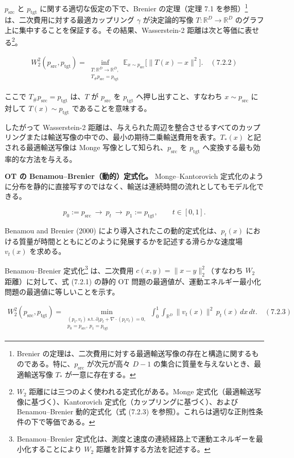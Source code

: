 $p_{\mathrm{src}}$ と $p_{\mathrm{tgt}}$ に関する適切な仮定の下で、Brenier の定理（定理 7.1 を参照）\footnote{Brenier の定理は、二次費用に対する最適輸送写像の存在と構造に関するものである。特に、$p_{\mathrm{src}}$ が次元が高々 $D-1$ の集合に質量を与えないとき、最適輸送写像 $T_*$ が一意に存在する。} は、二次費用に対する最適カップリング $\gamma$ が決定論的写像 $T:\mathbb{R}^D\to\mathbb{R}^D$ のグラフ上に集中することを保証する。その結果、Wasserstein-2 距離は次と等価に表せる\footnote{$W_2$ 距離には三つのよく使われる定式化がある。Monge 定式化（最適輸送写像に基づく）、Kantorovich 定式化（カップリングに基づく）、および Benamou–Brenier 動的定式化（式 (7.2.3) を参照）。これらは適切な正則性条件の下で等価である。}。

\begin{align*}
W_2^2(p_{\mathrm{src}},p_{\mathrm{tgt}})
=
\inf_{\substack{T:\mathbb{R}^D\to\mathbb{R}^D,\\ T_{\#}p_{\mathrm{src}}=p_{\mathrm{tgt}}}}
\mathbb{E}_{x\sim p_{\mathrm{src}}}\bigl[\|T(x)-x\|^2\bigr].
\quad (7.2.2)
\end{align*}


ここで $T_{\#}p_{\mathrm{src}}=p_{\mathrm{tgt}}$ は、$T$ が $p_{\mathrm{src}}$ を $p_{\mathrm{tgt}}$ へ押し出すこと、すなわち $x\sim p_{\mathrm{src}}$ に対して $T(x)\sim p_{\mathrm{tgt}}$ であることを意味する。

したがって Wasserstein-2 距離は、与えられた周辺を整合させるすべてのカップリングまたは輸送写像の中での、最小の期待二乗輸送費用を表す。$T_*(x)$ と記される最適輸送写像は Monge 写像として知られ、$p_{\mathrm{src}}$ を $p_{\mathrm{tgt}}$ へ変換する最も効率的な方法を与える。

\textbf{OT の Benamou–Brenier（動的）定式化。} Monge–Kantorovich 定式化のように分布を静的に直接写すのではなく、輸送は連続時間の流れとしてもモデル化できる。

\[
p_0:=p_{\mathrm{src}}\ \to\ p_t\ \to\ p_1:=p_{\mathrm{tgt}},\qquad t\in[0,1].
\]


Benamou and Brenier (2000) により導入されたこの動的定式化は、$p_t(x)$ における質量が時間とともにどのように発展するかを記述する滑らかな速度場 $v_t(x)$ を求める。

Benamou–Brenier 定式化\footnote{Benamou–Brenier 定式化は、測度と速度の連続経路上で運動エネルギーを最小化することにより $W_2$ 距離を計算する方法を記述する。} は、二次費用 $c(x,y)=\|x-y\|_2^2$（すなわち $W_2$ 距離）に対して、式 (7.2.1) の静的 OT 問題の最適値が、運動エネルギー最小化問題の最適値に等しいことを示す。

\begin{align*}
W_2^2(p_{\mathrm{src}},p_{\mathrm{tgt}})
=
\min_{\substack{(p_t,v_t)\ \mathrm{s.t.}\ \partial_t p_t+\nabla\cdot(p_t v_t)=0,\\ p_0=p_{\mathrm{src}},\ p_1=p_{\mathrm{tgt}}}}
\int_0^1\int_{\mathbb{R}^D}\|v_t(x)\|^2\,p_t(x)\,dx\,dt.
\quad (7.2.3)
\end{align*}


